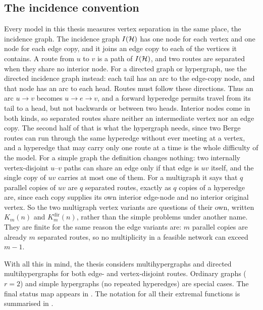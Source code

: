 \subsection{The incidence convention}\label{sec:incidence-convention}

Every model in this thesis measures vertex separation in the same place, the
incidence graph.
The incidence graph $I(\mathcal{H})$ has one node for each vertex and one node for each
edge copy, and it joins an edge copy to each of the vertices it contains. A route
from $u$ to $v$ is a path of $I(\mathcal{H})$, and two routes are separated when they
share no interior node. For a directed graph or hypergraph, use the directed
incidence graph instead: each tail has an arc to the edge-copy node, and that
node has an arc to each head. Routes must follow these directions. Thus an arc
$u\to v$ becomes $u\to e\to v$, and a forward hyperedge permits travel from
its tail to a head, but not backwards or between two heads.
Interior nodes come in both kinds, so separated routes
share neither an intermediate vertex nor an edge copy. The second half of that is
what the hypergraph needs, since two Berge routes can run through the same
hyperedge without ever meeting at a vertex, and a hyperedge that may carry only
one route at a time is the whole difficulty of the model.
For a simple graph the definition changes nothing: two internally vertex-disjoint
$u$--$v$ paths can share an edge only if that edge is $uv$ itself, and the single
copy of $uv$ carries at most one of them. For a multigraph it says that $q$
parallel copies of $uv$ are $q$ separated routes, exactly as $q$ copies of a
hyperedge are, since each copy supplies its own interior edge-node and no interior original vertex. So the
two multigraph vertex variants are questions of their own, written $K_m(n)$ and
$K_m^{\mathrm{dir}}(n)$, rather than the simple problems under another name. They
are finite for the same reason the edge variants are: $m$ parallel copies are
already $m$ separated routes, so no multiplicity in a feasible network can exceed
$m-1$.

With all this in mind, the thesis considers multihypergraphs and directed multihypergraphs for both edge- and vertex-disjoint routes.
Ordinary graphs ($r=2$) and simple hypergraphs (no repeated hyperedges) are special cases.
The final status map appears in .
The notation for all their extremal functions is summarised in .


